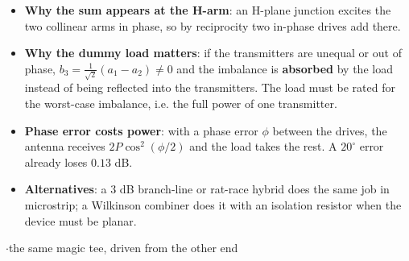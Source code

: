 \begin{itemize}
  \item \textbf{Why the sum appears at the H-arm}: an H-plane junction excites the two
    collinear arms in phase, so by reciprocity two in-phase drives add there.
  \item \textbf{Why the dummy load matters}: if the transmitters are unequal or out of
    phase, $b_3 = \tfrac{1}{\sqrt{2}}(a_1 - a_2) \neq 0$ and the imbalance is
    \textbf{absorbed} by the load instead of being reflected into the transmitters. The
    load must be rated for the worst-case imbalance, i.e. the full power of one
    transmitter.
  \item \textbf{Phase error costs power}: with a phase error $\phi$ between the drives,
    the antenna receives $2P\cos^2(\phi/2)$ and the load takes the rest. A $20^\circ$
    error already loses $0.13$ dB.
  \item \textbf{Alternatives}: a $3$ dB branch-line or rat-race hybrid does the same job in
    microstrip; a Wilkinson combiner does it with an isolation resistor when the device
    must be planar.
\end{itemize}

\vspace{2pt}

{\color{sub}\footnotesize {} \gap$\cdot$\gap the same magic tee, driven from the other end}

